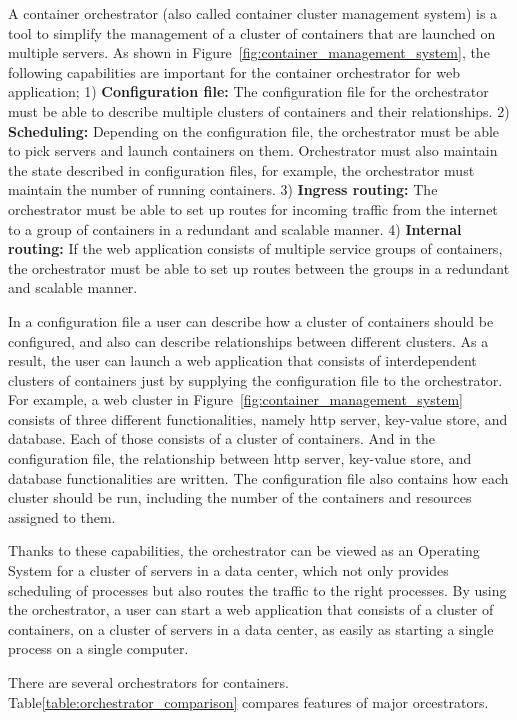 A container orchestrator (also called container cluster management system) is a tool to simplify the management of a cluster of containers that are launched on multiple servers.
As shown in Figure~\ref{fig:container_management_system}, the following capabilities are important for the container orchestrator for web application;
1) {\bf Configuration file:} The configuration file for the orchestrator must be able to describe multiple clusters of containers and their relationships.
2) {\bf Scheduling:} Depending on the configuration file, the orchestrator must be able to pick servers and launch containers on them. Orchestrator must also maintain the state described in configuration files, for example, the orchestrator must maintain the number of running containers.
3) {\bf Ingress routing:} The orchestrator must be able to set up routes for incoming traffic from the internet to a group of containers in a redundant and scalable manner.
4) {\bf Internal routing:} If the web application consists of multiple service groups of containers, the orchestrator must be able to set up routes between the groups in a redundant and scalable manner.

In a configuration file a user can describe how a cluster of containers should be configured, and also can describe relationships between different clusters.
As a result, the user can launch a web application that consists of interdependent clusters of containers just by supplying the configuration file to the orchestrator.
For example, a web cluster in Figure~\ref{fig:container_management_system} consists of three different functionalities, namely http server, key-value store, and database.
Each of those consists of a cluster of containers.
And in the configuration file, the relationship between http server, key-value store, and database functionalities are written.
The configuration file also contains how each cluster should be run, including the number of the containers and resources assigned to them.

Thanks to these capabilities, the orchestrator can be viewed as an Operating System for a cluster of servers in a data center, which not only provides scheduling of processes but also routes the traffic to the right processes.
By using the orchestrator, a user can start a web application that consists of a cluster of containers, on a cluster of servers in a data center, as easily as starting a single process on a single computer.

There are several orchestrators for containers. Table\ref{table:orchestrator_comparison} compares features of major orcestrators.

